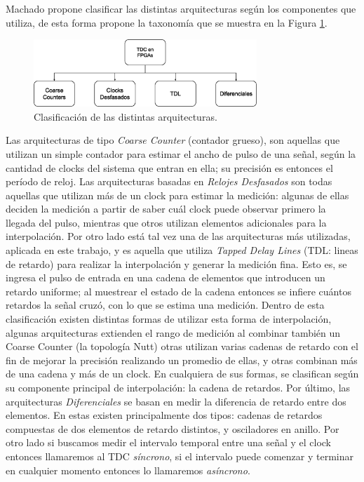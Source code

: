 Machado propone clasificar las distintas arquitecturas según los componentes que utiliza, de esta forma propone la taxonomía que
se muestra en la Figura \ref{fig: taxonomia}.
\begin{figure}[H]
     \centering
     \includegraphics[width=0.75\textwidth]{imagenes/taxonomia.eps}
     \caption{Clasificación de las distintas arquitecturas.}
     \label{fig: taxonomia}
\end{figure}
Las arquitecturas de tipo \textit{Coarse Counter} (contador grueso), son aquellas que utilizan 
un simple contador para estimar el ancho de pulso de una señal, según la cantidad de clocks del 
sistema que entran en ella; su precisión es entonces el período de reloj. Las arquitecturas basadas 
en \textit{Relojes Desfasados} son todas aquellas que utilizan más de un clock para estimar la medición:
algunas de ellas deciden la medición a partir de saber cuál clock puede observar primero la llegada del pulso, 
mientras que otros utilizan elementos adicionales para la interpolación. 
Por otro lado está tal vez una de las arquitecturas más utilizadas, aplicada en este trabajo, y es aquella 
que utiliza \textit{Tapped Delay Lines} (TDL: lineas de retardo) para realizar la interpolación y 
generar la medición fina. Esto es, se ingresa el pulso de entrada en una cadena de elementos que introducen un 
retardo uniforme; al muestrear el estado de la cadena entonces se infiere cuántos retardos la señal cruzó, con lo 
que se estima una medición. Dentro de esta clasificación existen distintas formas de utilizar esta forma de 
interpolación, algunas arquitecturas extienden el rango de medición al combinar también un Coarse Counter (la
topología Nutt) otras utilizan varias cadenas de retardo con el fin de mejorar la precisión realizando un 
promedio de ellas, y otras combinan más de una cadena y más de un clock. En cualquiera de sus formas, se 
clasifican según su componente principal de interpolación:
la cadena de retardos. Por último, las arquitecturas \textit{Diferenciales} se basan en medir la diferencia 
de retardo entre dos elementos. En estas existen principalmente dos tipos: cadenas de retardos compuestas de 
dos elementos de retardo distintos, y osciladores en anillo.
Por otro lado si buscamos medir el intervalo temporal entre una señal y el clock entonces llamaremos al TDC 
\textit{síncrono}, si el intervalo puede comenzar y terminar en cualquier momento entonces lo llamaremos 
\textit{asíncrono}.\\

